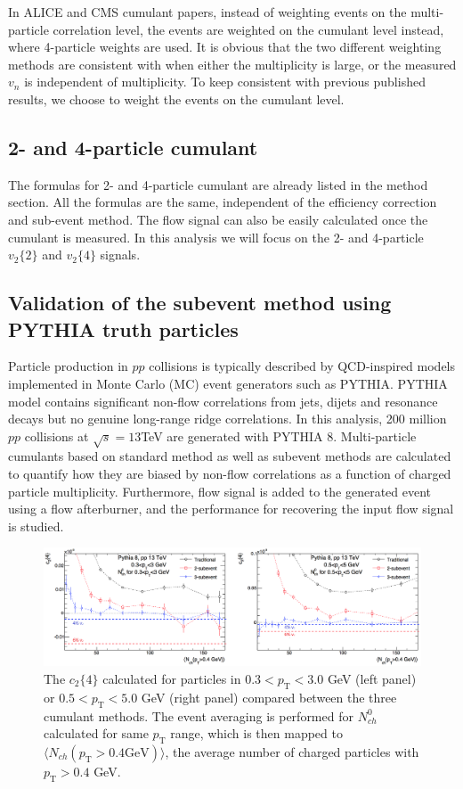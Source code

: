 In ALICE and CMS cumulant papers, instead of weighting events on the multi-particle correlation level, the events are weighted on the cumulant level instead, where 4-particle weights are used. It is obvious that the two different weighting methods are consistent with when either the multiplicity is large, or the measured $v_{n}$ is independent of multiplicity. To keep consistent with previous published results, we choose to weight the events on the cumulant level.

\subsection{2- and 4-particle cumulant}
The formulas for 2- and 4-particle cumulant are already listed in the method section. All the formulas are the same, independent of the efficiency correction and sub-event method. The flow signal can also be easily calculated once the cumulant is measured. In this analysis we will focus on the 2- and 4-particle $v_{2}\{2\}$ and $v_{2}\{4\}$ signals.



\subsection{Validation of the subevent method using PYTHIA truth particles}
Particle production in $pp$ collisions is typically described by QCD-inspired models implemented in Monte Carlo (MC) event generators such as PYTHIA. PYTHIA model contains significant non-flow correlations from jets, dijets and resonance decays but no genuine long-range ridge correlations. In this analysis, 200 million $pp$ collisions at $\sqrt{s}=13 $TeV are generated with PYTHIA 8. Multi-particle cumulants based on standard method as well as subevent methods are calculated to quantify how they are biased by non-flow correlations as a function of charged particle multiplicity. Furthermore, flow signal is added to the generated event using a flow afterburner, and the performance for recovering the input flow signal is studied.

\begin{figure}[H]
\centering
\includegraphics[width=0.9\linewidth]{figs/sec_ana/valid_PYTHIA_truth_c24.png}
\caption{The $c_{2}\{4\}$ calculated for particles in $0.3<p_{\text{T}}<3.0$ GeV (left panel) or $0.5<p_{\text{T}}<5.0$ GeV (right panel) compared between the three cumulant methods. The event averaging is performed for $N_{ch}^{0}$ calculated for same $p_{\text{T}}$ range, which is then mapped to $\langle N_{ch}(p_{\text{T}}>0.4 \text{GeV}) \rangle$, the average number of charged particles with $p_{\text{T}}>0.4$ GeV.}
\label{fig:valid_PYTHIA_truth_c24}
\end{figure}

